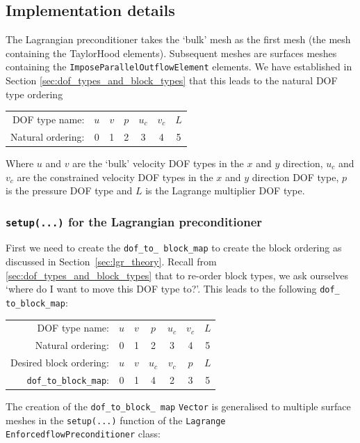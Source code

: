 \subsection{Implementation details\label{sec:lgr_implementation}}

The Lagrangian preconditioner takes the `bulk' mesh as the first mesh (the mesh containing the TaylorHood elements). Subsequent meshes are surfaces meshes containing the \texttt{Impose\allowbreak Parallel\allowbreak Outflow\allowbreak Element} elements. We have established in Section \ref{sec:dof_types_and_block_types} that this leads to the natural DOF type ordering
\begin{center}
    \begin{tabular}{ | r | c c c c c c |}
    \hline
    DOF type name:    & $u$ & $v$ & $p$ & $u_c$ & $v_c$ & $L$ \\ 
    Natural ordering: & 0   &  1  &  2  &   3   &   4   &  5  \\ 
    \hline
    \end{tabular}
\end{center}
Where $u$ and $v$ are the `bulk' velocity DOF types in the $x$ and $y$
direction, $u_c$ and $v_c$ are the constrained velocity DOF types in the $x$
and $y$ direction DOF type, $p$ is the pressure DOF type and $L$ is the
Lagrange multiplier DOF type. 


 \subsubsection{\texttt{setup(...)} for the Lagrangian preconditioner\label{sec:lgr_setup}}
First we need to create the \texttt{dof\_\allowbreak to\_\allowbreak
  block\_\allowbreak map} to create the block ordering as discussed in
Section~\ref{sec:lgr_theory}. Recall from \ref{sec:dof_types_and_block_types}
that to re-order block types, we ask ourselves `where do I want to move this
DOF type to?'. This leads to the following \texttt{dof\_\allowbreak
  to\_\allowbreak block\_\allowbreak map}:
\begin{center}
    \begin{tabular}{ | r | c c c c c c |}
    \hline
    DOF type name:      & $u$ & $v$ & $p$ & $u_c$  & $v_c$ & $L$ \\ 
    Natural ordering:   & 0   &  1  &  2  &   3    &   4   &  5  \\ 
Desired block ordering: & $u$ & $v$ & $u_c$ & $v_c$& $p$   & $L$ \\ 
\texttt{dof\_to\_block\_map}:& 0   &  1  &  4  &   2    &   3   &  5  \\
    \hline
    \end{tabular}
\end{center}
The creation of the \texttt{dof\_\allowbreak to\_\allowbreak block\_\allowbreak
  map} \texttt{Vector} is generalised to multiple surface meshes in the
\texttt{setup(...)} function of the \texttt{Lagrange\allowbreak
  Enforcedflow\allowbreak Preconditioner} class:


